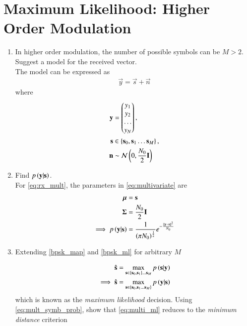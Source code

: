 \documentclass[journal,12pt,twocolumn]{IEEEtran}
\renewcommand\thesection{\arabic{section}}
\begin{document}
\section{Maximum Likelihood: Higher Order Modulation}
\begin{enumerate}[label=\thesection.\arabic*.,ref=\thesection.\theenumi]
\item In higher order modulation, the number of possible symbols can be $M > 2$.  Suggest a model for the received vector.
\\
\solution The model can be expressed as
\begin{align}
\label{eq:rx_mult}
\vec{y} = \vec{s} + \vec{n}
\end{align}
%
where
\begin{align}
\mathbf{y} &= \begin{pmatrix}y_1\\y_2\\ \dots\\y_N\end{pmatrix},
\\
\mathbf{s} &\in \left\{\mathbf{s}_0,\mathbf{s}_1 \dots \mathbf{s}_M\right\},
\\
\mathbf{n} &\sim  \mathcal{N}\left(0,\frac{N_0}{2}\mathbf{I}\right)
\end{align}
\item Find $p\left(\mathbf{y}| \mathbf{s}\right)$.
\\
\solution For \eqref{eq:rx_mult}, the parameters in \eqref{eq:multivariate} are
\begin{align}
\bm{\mu} &= \mathbf{s}
\\
\bm{\Sigma} &= \frac{N_0}{2}\mathbf{I}
\\
\implies p\left(\mathbf{y}| \mathbf{s}\right) &= \frac{1}{\left(\pi N_0\right)^{\frac{1}{2}}}e^{-\frac{\left\lVert\mathbf{y}-\mathbf{s}\right\rVert^2}{N_0}}
\label{eq:mult_symb_prob}
\end{align}



\item Extending \eqref{bpsk_map}
 and \eqref{bpsk_ml} for arbitrary $M$

\begin{align}
\hat{\mathbf{s}} = \max_{\mathbf{s} \in \left\{\mathbf{s}_0,\mathbf{s}_1\right\}\dots \mathbf{s}_M} p\left(\mathbf{s}|\mathbf{y}\right)
\\
\implies \hat{\mathbf{s}} = \max_{\mathbf{s} \in \left\{\mathbf{s}_0,\mathbf{s}_1 \dots \mathbf{s}_M\right\}} p\left(\mathbf{y}|\mathbf{s}\right)
\label{eq:multi_ml}
\end{align}
%
which is known as the {\em maximum likelihood} decision.  Using \eqref{eq:mult_symb_prob}, show that \eqref{eq:multi_ml} reduces to the {\em minimum distance} criterion


\end{enumerate}
\end{document}
